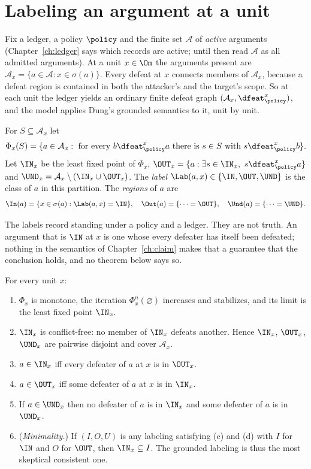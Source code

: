 \section{Labeling an argument at a unit}

Fix a ledger, a policy $\policy$ and the finite set $\mathcal A$ of \emph{active} arguments (Chapter~\ref{ch:ledger} says which records are active; until then read $\mathcal A$ as all admitted arguments). At a unit $x\in\Om$ the arguments present are $\mathcal A_x=\{a\in\mathcal A: x\in\sigma(a)\}$. Every defeat at $x$ connects members of $\mathcal A_x$, because a defeat region is contained in both the attacker's and the target's scope. So at each unit the ledger yields an ordinary finite defeat graph $(\mathcal A_x,\dfeat_\policy^x)$, and the model applies Dung's grounded semantics to it, unit by unit.

\begin{definition}\label{def:grounded}
For $S\subseteq\mathcal A_x$ let
\[
\Phi_x(S)=\{a\in\mathcal A_x:\ \text{for every }b\dfeat^x_\policy a\text{ there is }s\in S\text{ with }s\dfeat^x_\policy b\}.
\]
Let $\IN_x$ be the least fixed point of $\Phi_x$, $\OUT_x=\{a:\exists s\in\IN_x,\ s\dfeat^x_\policy a\}$ and $\UND_x=\mathcal A_x\setminus(\IN_x\cup\OUT_x)$. The \emph{label} $\Lab(a,x)\in\{\IN,\OUT,\UND\}$ is the class of $a$ in this partition. The \emph{regions} of $a$ are
\[
\In(a)=\{x\in\sigma(a):\Lab(a,x)=\IN\},\quad \Out(a)=\{\dots=\OUT\},\quad \Und(a)=\{\dots=\UND\}.
\]
\end{definition}

The labels record standing under a policy and a ledger. They are not truth. An argument that is $\IN$ at $x$ is one whose every defeater has itself been defeated; nothing in the semantics of Chapter~\ref{ch:claim} makes that a guarantee that the conclusion holds, and no theorem below says so.

\begin{theorem}\label{thm:labels}
For every unit $x$:
\begin{enumerate}[label=(\alph*)]
\item $\Phi_x$ is monotone, the iteration $\Phi_x^n(\varnothing)$ increases and stabilizes, and its limit is the least fixed point $\IN_x$.
\item $\IN_x$ is conflict-free: no member of $\IN_x$ defeats another. Hence $\IN_x$, $\OUT_x$, $\UND_x$ are pairwise disjoint and cover $\mathcal A_x$.
\item $a\in\IN_x$ iff every defeater of $a$ at $x$ is in $\OUT_x$.
\item $a\in\OUT_x$ iff some defeater of $a$ at $x$ is in $\IN_x$.
\item If $a\in\UND_x$ then no defeater of $a$ is in $\IN_x$ and some defeater of $a$ is in $\UND_x$.
\item (\emph{Minimality.}) If $(I,O,U)$ is any labeling satisfying (c) and (d) with $I$ for $\IN$ and $O$ for $\OUT$, then $\IN_x\subseteq I$. The grounded labeling is thus the most skeptical consistent one.
\end{enumerate}
\end{theorem}

